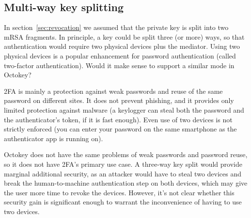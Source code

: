 \subsection{Multi-way key splitting}\label{sec:multiway}

In section~\ref{sec:revocation} we assumed that the private key is split into two mRSA fragments. In
principle, a key could be split three (or more) ways, so that authentication would require two
physical devices plus the mediator. Using two physical devices is a popular enhancement for
password authentication (called two-factor authentication). Would it make sense to support a similar
mode in Octokey?

2FA is mainly a protection against weak passwords and reuse of the same password on different sites.
It does not prevent phishing, and it provides only limited protection against malware (a keylogger
can steal both the password and the authenticator's token, if it is fast enough). Even use of two
devices is not strictly enforced (you can enter your password on the same smartphone as the
authenticator app is running on).

Octokey does not have the same problems of weak passwords and password reuse, so it does not have
2FA's primary use case. A three-way key split would provide marginal additional security, as an
attacker would have to steal two devices and break the human-to-machine authentication step on both
devices, which may give the user more time to revoke the devices. However, it's not clear whether
this security gain is significant enough to warrant the inconvenience of having to use two devices.
